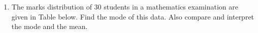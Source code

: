 \renewcommand{\theequation}{\theenumi}
\begin{enumerate}[label=\arabic*.,ref=\thesubsection.\theenumi]
\item The marks distribution of 30 students in a mathematics examination are
given in Table below. Find the mode of this data. Also compare and
interpret the mode and the mean.
\begin{table}[!ht]
	\centering
	
\end{table}
\end{enumerate}